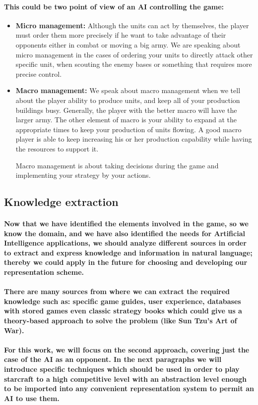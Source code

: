 \documentclass[a4paper,10pt]{article}
\newcommand{\p}[1]{\paragraph{\indent\textnormal{#1}}}
\begin{document}
      \p{This could be two point of view of an AI controlling the game:}

      \begin{itemize}
       \item \textbf{Micro management:} Although the units can act by themselves, the player must order them more precisely if he want to take advantage of their opponents either in combat or moving a big army. We are speaking about micro management in the cases of ordering your units to directly attack other specific unit, when scouting the enemy bases or something that requires more precise control.

      \item \textbf{Macro management:} We speak about macro management when we tell about the player ability to produce units, and keep all of your production buildings busy. Generally, the player with the better macro will have the larger army. The other element of macro is your ability to expand at the appropriate times to keep your production of units flowing. A good macro player is able to keep increasing his or her production capability while having the resources to support it.

      Macro management is about taking decisions during the game and implementing your strategy by your actions. 
      \end{itemize}


    \subsection{Knowledge extraction}

      \p{Now that we have identified the elements involved in the game, so we know the domain, and we have also identified the needs for Artificial Intelligence applications, we should analyze different sources in order to extract and express knowledge and information in natural language; thereby we could apply in the future for choosing and developing our representation scheme.}

      \p{There are many sources from where we can extract the required knowledge such as: specific game guides, user experience, databases with stored games even classic strategy books which could give us a theory-based approach to solve the problem (like Sun Tzu's Art of War).}

      \p{For this work, we will focus on the second approach, covering just the case of the AI as an opponent. In the next paragraphs we will introduce specific techniques which should be used in order to play starcraft to a high competitive level with an abstraction level enough to be imported into any convenient representation system to permit an AI to use them.}
\end{document}
